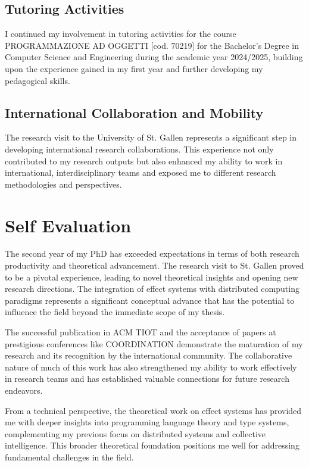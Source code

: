 \documentclass[runningheads]{llncs}
\begin{document}
\subsection{Tutoring Activities}

I continued my involvement in tutoring activities for the course PROGRAMMAZIONE AD OGGETTI [cod. 70219] for the Bachelor's Degree in Computer Science and Engineering during the academic year 2024/2025, building upon the experience gained in my first year and further developing my pedagogical skills.

\subsection{International Collaboration and Mobility}

The research visit to the University of St. Gallen represents a significant step in developing international research collaborations. This experience not only contributed to my research outputs but also enhanced my ability to work in international, interdisciplinary teams and exposed me to different research methodologies and perspectives.

\section{Self Evaluation}

The second year of my PhD has exceeded expectations in terms of both research productivity and theoretical advancement. The research visit to St. Gallen proved to be a pivotal experience, leading to novel theoretical insights and opening new research directions. The integration of effect systems with distributed computing paradigms represents a significant conceptual advance that has the potential to influence the field beyond the immediate scope of my thesis.

The successful publication in ACM TIOT and the acceptance of papers at prestigious conferences like COORDINATION demonstrate the maturation of my research and its recognition by the international community. The collaborative nature of much of this work has also strengthened my ability to work effectively in research teams and has established valuable connections for future research endeavors.

From a technical perspective, the theoretical work on effect systems has provided me with deeper insights into programming language theory and type systems, complementing my previous focus on distributed systems and collective intelligence. This broader theoretical foundation positions me well for addressing fundamental challenges in the field.
\end{document}
